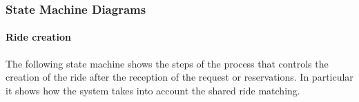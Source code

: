 \documentclass[a4paper,11pt]{report} %
\begin{document}
%	
%
	
	

	
	
	\pagebreak
	
	\subsubsection{State Machine Diagrams} 
	
		\paragraph{Ride creation} The following state machine shows the steps of the process that controls the creation of the ride after the reception of the request or reservations. In particular it shows how the system takes into account the shared ride matching.\\
		\noindent%
		\begin{minipage}{\linewidth}
		\end{minipage}	
		
\end{document}

